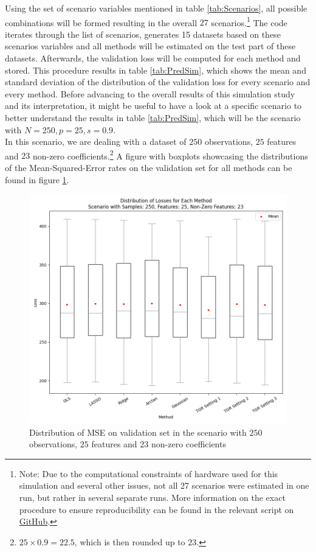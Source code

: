 \documentclass[12pt,a4paper]{article}
\begin{document}
Using the set of scenario variables mentioned in table \ref{tab:Scenarios}, all possible combinations will be formed resulting in the overall $27$ scenarios.\footnote{Note: Due to the computational constraints of hardware used for this simulation  and several other issues, not all 27 scenarios were estimated in one run, but rather in several separate runs. More information on the exact procedure to ensure reproducibility can be found in the relevant script on \href{https://github.com/therealLucasPaul/MScThesis_Econ}{GitHub}.} The code iterates through the list of scenarios, generates 15 datasets based on these scenarios variables and all methods will be estimated on the test part of these datasets. Afterwards, the validation loss will be computed for each method and stored. This procedure results in table \ref{tab:PredSim}, which shows the mean and standard deviation of the distribution of the validation loss for every scenario and every method. Before advancing to the overall results of this simulation study and its interpretation, it might be useful to have a look at a specific scenario to better understand the results in table \ref{tab:PredSim}, which will be the scenario with $N=250, p=25, s=0.9$.\\

In this scenario, we are dealing with a dataset of $250$ observations, $25$ features and $23$ non-zero coefficients.\footnote{$25 \times 0.9 = 22.5$, which is then rounded up to $23$.} A figure with boxplots showcasing the distributions of the Mean-Squared-Error rates on the validation set for all methods can be found in figure \ref{fig:SpecificScenario1}.

\begin{figure}[H]
\centering
\includegraphics[scale=0.6]{../02_simulation/021_simulation_figures/Boxplot_Scenario_250_25_23.png}
\caption{Distribution of MSE on validation set in the scenario with $250$ observations, $25$ features and $23$ non-zero coefficients}
\label{fig:SpecificScenario1}
\end{figure} 	
\end{document}
